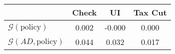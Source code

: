 \begin{tabular}{@{}lccc@{}} 
\toprule 
                          & Check      & UI    & Tax Cut    \\  \midrule 
$\mathcal{G}(\text{policy})$ & 0.002  & -0.000  & 0.000     \\ 
$\mathcal{G}(AD,\text{policy})$ & 0.044  & 0.032  & 0.017     \\ 
\end{tabular}  
